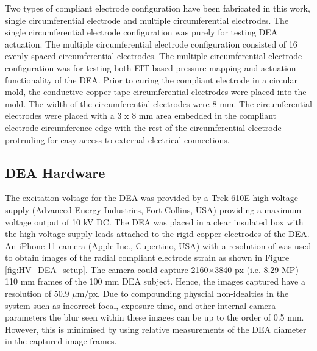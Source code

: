 Two types of compliant electrode configuration have been fabricated in this work, single circumferential electrode and multiple circumferential electrodes. The single circumferential electrode configuration was purely for testing DEA actuation. The multiple circumferential electrode configuration consisted of 16 evenly spaced circumferential electrodes. The multiple circumferential electrode configuration was for testing both EIT-based pressure mapping and actuation functionality of the DEA. Prior to curing the compliant electrode in a circular mold, the conductive copper tape circumferential electrodes were placed into the mold. The width of the circumferential electrodes were 8 mm. The circumferential electrodes were placed with a 3 x 8 mm area embedded in the compliant electrode circumference edge with the rest of the circumferential electrode protruding for easy access to external electrical connections.


\subsection{DEA Hardware}
\label{subsec:dea_hw}
The excitation voltage for the DEA was provided by a Trek 610E high voltage supply (Advanced Energy Industries, Fort Collins, USA) providing a maximum voltage output of 10 kV DC. The DEA was placed in a clear insulated box with the high voltage supply leads attached to the rigid copper electrodes of the DEA. An iPhone 11 camera (Apple Inc., Cupertino, USA) with a resolution of was used to obtain images of the radial compliant electrode strain as shown in Figure \ref{fig:HV_DEA_setup}. The camera could capture 2160$\times$3840 px (i.e. 8.29 MP) 110 mm frames of the 100 mm DEA subject. Hence, the images captured have a resolution of 50.9 $\mu$m/px. Due to compounding physcial non-idealties in the system such as incorrect focal, exposure time, and other internal camera parameters the blur seen within these images can be up to the order of 0.5 mm. However, this is minimised by using relative measurements of the DEA diameter in the captured image frames.


